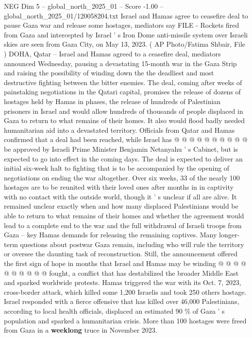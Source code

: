 \begin{textsample}{NEG Dim 5 – global\_north\_2025\_01 – Score -1.00 – global\_north\_2025\_01/120058204.txt}  \label{ex:f5_neg_184}
Israel and Hamas agree to ceasefire deal to pause Gaza war and release some hostages, mediators say FILE - Rockets fired from Gaza and intercepted by Israel ' s Iron Dome anti-missile system over Israeli skies are seen from Gaza City, on May 13, 2023. ( AP Photo/Fatima Shbair, File ) DOHA, Qatar -- Israel and Hamas agreed to a ceasefire deal, mediators announced Wednesday, pausing a devastating 15-month war in the Gaza Strip and raising the possibility of winding down the the deadliest and most destructive fighting between the bitter enemies.
The deal, coming after weeks of painstaking negotiations in the Qatari capital, promises the release of dozens of hostages held by Hamas in phases, the release of hundreds of Palestinian prisoners in Israel and would allow hundreds of thousands of people displaced in Gaza to return to what remains of their homes.
It also would flood badly needed humanitarian aid into a devastated territory.
Officials from Qatar and Hamas confirmed that a deal had been reached, while Israel has @ @ @ @ @ @ @ @ @ @ be approved by Israeli Prime Minister Benjamin Netanyahu ' s Cabinet, but is expected to go into effect in the coming days.
The deal is expected to deliver an initial six-week halt to fighting that is to be accompanied by the opening of negotiations on ending the war altogether.
Over six weeks, 33 of the nearly 100 hostages are to be reunited with their loved ones after months in in captivity with no contact with the outside world, though it ' s unclear if all are alive.
It remained unclear exactly when and how many displaced Palestinians would be able to return to what remains of their homes and whether the agreement would lead to a complete end to the war and the full withdrawal of Israeli troops from Gaza -- key Hamas demands for releasing the remaining captives.
Many longer-term questions about postwar Gaza remain, including who will rule the territory or oversee the daunting task of reconstruction.
Still, the announcement offered the first sign of hope in months that Israel and Hamas may be winding @ @ @ @ @ @ @ @ @ @ fought, a conflict that has destabilized the broader Middle East and sparked worldwide protests.
Hamas triggered the war with its Oct. 7, 2023, cross-border attack, which killed some 1,200 Israelis and took 250 others hostage.
Israel responded with a fierce offensive that has killed over 46,000 Palestinians, according to local health officials, displaced an estimated 90 \% of Gaza ' s population and sparked a humanitarian crisis.
More than 100 hostages were freed from Gaza in a \textbf{weeklong} truce in November 2023.

\end{textsample}
